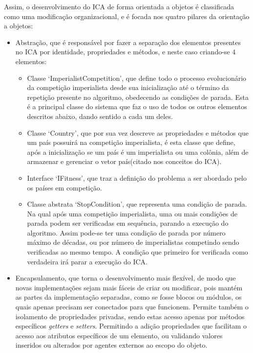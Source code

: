 Assim, o desenvolvimento do ICA de forma orientada a objetos é classificada como uma modificação organizacional, e é focada nos quatro pilares da orientação a objetos:
\begin{itemize}
\item Abstração, que é responsável por fazer a separação dos elementos presentes no ICA por identidade, propriedades e métodos, e neste caso criando-se 4 elementos:

\begin{itemize}
\item Classe ‘ImperialistCompetition’, que define todo o processo evolucionário da competição imperialista desde sua inicialização até o término da repetição presente no algoritmo, obedecendo as condições de parada. Esta é a principal classe do sistema que faz o uso de todos os outros elementos descritos abaixo, dando sentido a cada um deles.
\item Classe ‘Country’, que por sua vez descreve as propriedades e métodos que um país possuirá na competição imperialista, é esta classe que define, após a inicialização se um país é um imperialista ou uma colônia, além de armazenar e gerenciar o vetor país(citado nos conceitos do ICA).
\item Interface ‘IFitness’, que traz a definição do problema a ser abordado pelo os países em competição.
\item  Classe abstrata ‘StopCondition’, que representa uma condição de parada. Na qual após uma competição imperialista, uma ou mais condições de parada podem ser verificadas em sequência, parando a execução do algoritmo. Assim pode-se ter uma condição de parada por número máximo de décadas, ou por número de imperialistas competindo sendo verificadas ao mesmo tempo. A condição que primeiro for verificada como verdadeira irá parar a execução do ICA.
\end{itemize}
 
\item Encapsulamento, que torna o desenvolvimento mais flexível, de modo que novas implementações sejam mais fáceis de criar ou modificar, pois mantém as partes da implementação separadas, como se fosse blocos ou módulos, os quais apenas precisam ser conectados para que funcionem. 
Permite também o isolamento de propriedades privadas, sendo estas acesso apenas por métodos específicos \emph{getters} e \emph{setters}. Permitindo a adição propriedades que facilitam o acesso aos atributos específicos de um elemento, ou validando valores inseridos ou alterados por agentes externos ao escopo do objeto.


\end{itemize}

